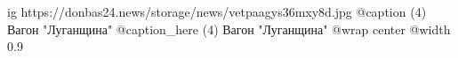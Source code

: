 
 
 
 
 

\ifcmt
  ig https://donbas24.news/storage/news/vetpaagys36mxy8d.jpg
	@caption (4) Вагон "Луганщина"
	@caption_here (4) Вагон "Луганщина"
  @wrap center
  @width 0.9
\fi
